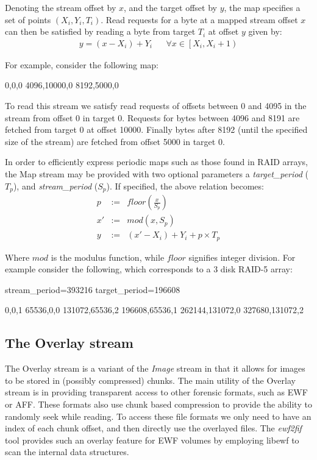 \documentclass[10pt, conference]{IEEEtran}
\begin{document}
Denoting the stream offset by $x$, and the target offset by $y$, the
map specifies a set of points $(X_i,Y_i,T_i)$. Read requests for a
byte at a mapped stream offset $x$ can then be satisfied by reading a
byte from target $T_i$ at offset $y$ given by:
\begin{eqnarray}
y = (x - X_i) + Y_i & &
\forall x \in \left [X_i, X_i+1 \right )
\end{eqnarray}

For example, consider the following map:
\begin{verbatim*}
0,0,0
4096,10000,0
8192,5000,0
\end{verbatim*}

To read this stream we satisfy read requests of offsets between 0 and
4095 in the stream from offset 0 in target 0. Requests for bytes
between 4096 and 8191 are fetched from target 0 at offset
10000. Finally bytes after 8192 (until the specified size of the
stream) are fetched from offset 5000 in target 0.

In order to efficiently express periodic maps such as those found in
RAID arrays, the Map stream may be provided with two optional
parameters a {\em target\_period} ($T_p$), and {\em stream\_period}
($S_p$). If specified, the above relation becomes:
\begin{eqnarray*}
p &:=& floor\left (\frac{x}{S_p} \right) \\
x' &:=& mod(x ,S_p)  \\   \label{eq:no1}
y &:=& (x'-X_i) + Y_i + p \times T_p
\end{eqnarray*}

Where $mod$ is the modulus function, while $floor$ signifies integer
division. For example consider the following, which corresponds to a 3
disk RAID-5 array:
\begin{verbatim*}
stream_period=393216
target_period=196608

0,0,1
65536,0,0
131072,65536,2
196608,65536,1
262144,131072,0
327680,131072,2
\end{verbatim*}

\subsection{The Overlay stream}
The Overlay stream is a variant of the {\em Image} stream in that it
allows for images to be stored in (possibly compressed) chunks. The
main utility of the Overlay stream is in providing transparent access
to other forensic formats, such as EWF or AFF. These formats also use
chunk based compression to provide the ability to randomly seek while
reading. To access these file formats we only need to have an index of
each chunk offset, and then directly use the overlayed files. The {\em
ewf2fif} tool provides such an overlay feature for EWF volumes by
employing libewf to scan the internal data structures.
\end{document}
